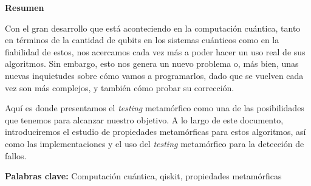 \newpage

\thispagestyle{empty}

\begin{center}

{\bf \Huge Resumen}

  \end{center}
\vspace{1cm}

 Con el gran desarrollo que está aconteciendo en la computación cuántica, tanto en términos de la cantidad de qubits en los sistemas cuánticos como en la fiabilidad de estos, nos acercamos cada vez más a poder hacer un uso real de sus algoritmos. Sin embargo, esto nos genera un nuevo problema o, más bien, unas nuevas inquietudes sobre cómo vamos a programarlos, dado que se vuelven cada vez son más complejos, y también cómo probar su corrección.\newline 
 
 Aquí es donde presentamos el \textit{testing} metamórfico como una de las posibilidades que tenemos para alcanzar nuestro objetivo. A lo largo de este documento, introduciremos el estudio de propiedades metamórficas para estos algoritmos, así como las implementaciones y el uso del \textit{testing} metamórfico para la detección de fallos.

\vspace{2cm}



\textbf{Palabras clave:} Computación cuántica, qiskit, propiedades metamórficas
   
   
   